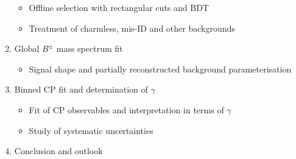 \documentclass[12pt, a4paper, notitlepage, onecolumn]{article}
\begin{document}
\begin{enumerate}
\begin{itemize}
    \item{Offline selection with rectangular cuts and BDT}
    \item{Treatment of charmless, mis-ID and other backgrounds}
  \end{itemize}
  \item{Global $B^\pm$ mass spectrum fit}
  \begin{itemize}
    \item{Signal shape and partially reconstructed background parameterisation}
  \end{itemize}
  \item{Binned CP fit and determination of $\gamma$}
  \begin{itemize}
    \item{Fit of CP observables and interpretation in terms of $\gamma$}
    \item{Study of systematic uncertainties}
  \end{itemize}
  \item{Conclusion and outlook}
\end{enumerate}
\end{document}
